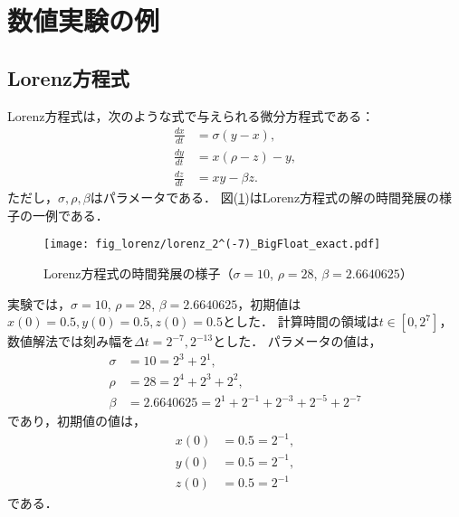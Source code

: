 \section{数値実験の例}
\subsection{Lorenz方程式}
Lorenz方程式は，次のような式で与えられる微分方程式である：
\begin{align}
    \frac{dx}{dt} &= \sigma(y-x), \\
    \frac{dy}{dt} &= x(\rho-z)-y, \\
    \frac{dz}{dt} &= xy - \beta z.
\end{align}
ただし，$\sigma,\rho,\beta$はパラメータである．
図(\ref{fig:lorenz})はLorenz方程式の解の時間発展の様子の一例である．
\begin{figure}[H]
    \centering
    \texttt{[image: fig\_lorenz/lorenz\_2^(-7)\_BigFloat\_exact.pdf]}
    \caption{Lorenz方程式の時間発展の様子（$\sigma=10$, $\rho=28$, $\beta=2.6640625$）}
    \label{fig:lorenz}
\end{figure}
実験では，$\sigma=10$, $\rho=28$, $\beta=2.6640625$，初期値は$x(0) = 0.5, y(0) = 0.5, z(0) = 0.5$とした．
計算時間の領域は$t \in [0,2^7]$，数値解法では刻み幅を$\Delta t =  2^{-7}, 2^{-13}$とした．
パラメータの値は，
\begin{align}
    \sigma &= 10 = 2^3 + 2^1, \\
    \rho &= 28 = 2^4 + 2^3 + 2^2, \\
    \beta &= 2.6640625 = 2^1 + 2^{-1} + 2^{-3} + 2^{-5} + 2^{-7}
\end{align}
であり，初期値の値は，
\begin{align}
    x(0) &= 0.5 = 2^{-1}, \\
    y(0) &= 0.5 = 2^{-1}, \\
    z(0) &= 0.5 = 2^{-1}
\end{align}
である．
